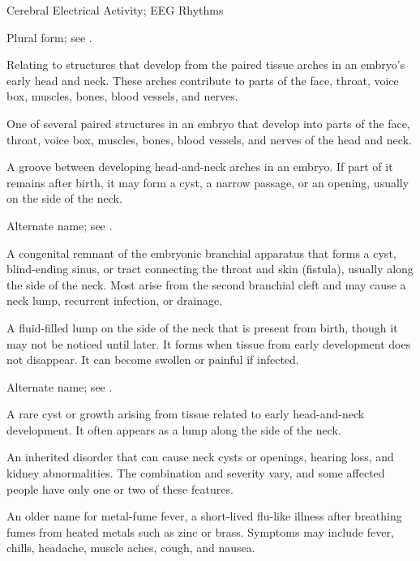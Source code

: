 \synonyms
Cerebral Electrical Activity; EEG Rhythms

 Plural form; see .

 Relating to structures that develop from the paired tissue arches in an embryo's early head and neck. These arches contribute to parts of the face, throat, voice box, muscles, bones, blood vessels, and nerves.

 One of several paired structures in an embryo that develop into parts of the face, throat, voice box, muscles, bones, blood vessels, and nerves of the head and neck.

 A groove between developing head-and-neck arches in an embryo. If part of it remains after birth, it may form a cyst, a narrow passage, or an opening, usually on the side of the neck.

 Alternate name; see .

 A congenital remnant of the embryonic branchial apparatus that forms a cyst, blind-ending sinus, or tract connecting the throat and skin (fistula), usually along the side of the neck. Most arise from the second branchial cleft and may cause a neck lump, recurrent infection, or drainage.

 A fluid-filled lump on the side of the neck that is present from birth, though it may not be noticed until later. It forms when tissue from early development does not disappear. It can become swollen or painful if infected.

 Alternate name; see .

 A rare cyst or growth arising from tissue related to early
head-and-neck development. It often appears as a lump along the side of the neck.

 An inherited disorder that can cause neck cysts or openings, hearing loss, and kidney abnormalities. The combination and severity vary, and some affected people have only one or two of these features.

 An older name for metal-fume fever, a short-lived flu-like illness after breathing fumes from heated metals such as zinc or brass. Symptoms may include fever, chills, headache, muscle aches, cough, and nausea.

